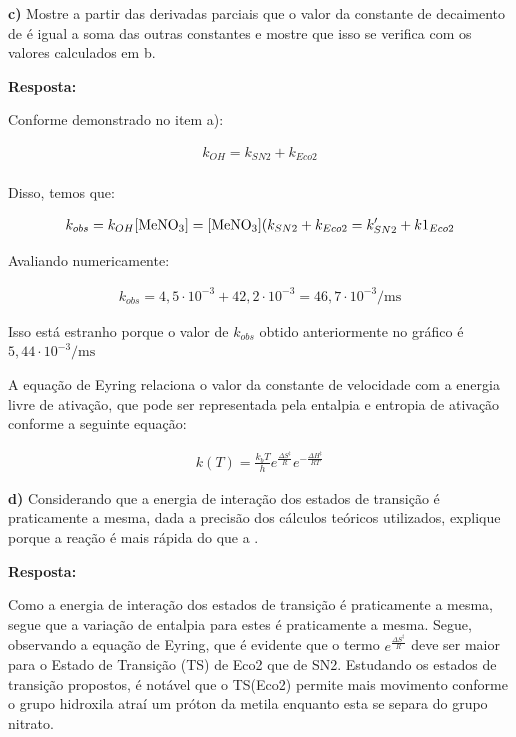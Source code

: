 \commentspace

\textbf{c)} Mostre a partir das derivadas parciais que o valor da constante de decaimento de  é igual a soma das outras constantes e mostre que isso se verifica com os valores calculados em b.

\textbf{Resposta:}

Conforme demonstrado no item a):

\begin{align*}
    k_{OH} = k_{SN2} + k_{Eco2} \\
\end{align*}

Disso, temos que:

\begin{align*}
    k_{obs} = k_{OH}[\ce{MeNO3}] = [\ce{MeNO3}] (k_{SN2} + k_{Eco2} = k'_{SN2} + k1_{Eco2}
\end{align*}

Avaliando numericamente:

\begin{align*}
    k_{obs} = 4,5 \cdot 10^{-3} + 42,2 \cdot 10^{-3} = 46,7 \cdot 10^{-3} \si{\per \milli \second}
\end{align*}

Isso está estranho porque o valor de \(k_{obs}\) obtido anteriormente no gráfico é \(5,44 \cdot 10^{-3} \si{\per\milli\second}\)

\commentspace

A equação de Eyring relaciona o valor da constante de velocidade com a energia livre de ativação, que pode ser representada pela entalpia e entropia de ativação conforme a seguinte equação:

\begin{align*}
    k(T) = \frac{k_b T}{h} e^{\frac{\Delta S^\ddagger}{R}} e^{-\frac{\Delta H^\ddagger}{RT}}   
\end{align*}


\textbf{d)} Considerando que a energia de interação dos estados de transição é praticamente a mesma, dada a precisão dos cálculos teóricos utilizados, explique porque a reação  é mais rápida do que a .

\textbf{Resposta:}

Como a energia de interação dos estados de transição é praticamente a mesma, segue que a variação de entalpia para estes é praticamente a mesma. Segue, observando a equação de Eyring, que é evidente que o termo \(e^{\frac{\Delta S^{\ddagger}}{R}}\) deve ser maior para o Estado de Transição (TS) de Eco2 que de SN2. Estudando os estados de transição propostos, é notável que o TS(Eco2) permite mais movimento conforme o grupo hidroxila atraí um próton da metila enquanto esta se separa do grupo nitrato.

